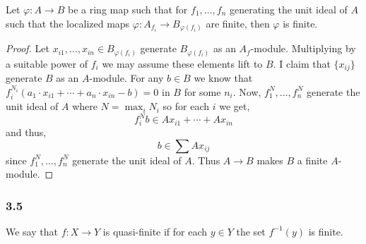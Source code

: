 \documentclass[12pt]{article}
\begin{document}
\begin{lemma} \label{finiteness_local}
Let $\varphi : A \to B$ be a ring map such that for $f_1, \dots, f_n$ generating the unit ideal of $A$ such that the localized maps $\varphi : A_{f_i} \to B_{\varphi(f_i)}$ are finite, then $\varphi$ is finite.
\end{lemma}

\begin{proof}
Let $x_{i1}, \dots, x_{in} \in B_{\varphi(f_i)}$ generate $B_{\varphi(f_i)}$ as an $A_f$-module. Multiplying by a suitable power of $f_i$ we may assume these elements lift to $B$. I claim that $\{ x_{ij} \}$ generate $B$ as an $A$-module. For any $b \in B$ we know that $f_i^{N_i} (a_1 \cdot x_{i1} + \cdots + a_n \cdot x_{in} - b) = 0$ in $B$ for some $n_i$.  Now, $f_1^N, \dots, f_n^N$ generate the unit ideal of $A$ where $N = \max_i N_i$ so for each $i$ we get,
\[ f_i^N b \in A x_{i1} + \cdots + A x_{in} \]
and thus,
\[ b \in  \sum A x_{ij} \]
since $f_1^N, \dots, f_n^N$ generate the unit ideal of $A$. Thus $A \to B$ makes $B$ a finite $A$-module.
\end{proof}

\subsubsection{3.5}

\begin{definition}
We say that $f : X \to Y$ is quasi-finite if for each $y \in Y$ the set $f^{-1}(y)$ is finite.
\end{definition}
\end{document}
